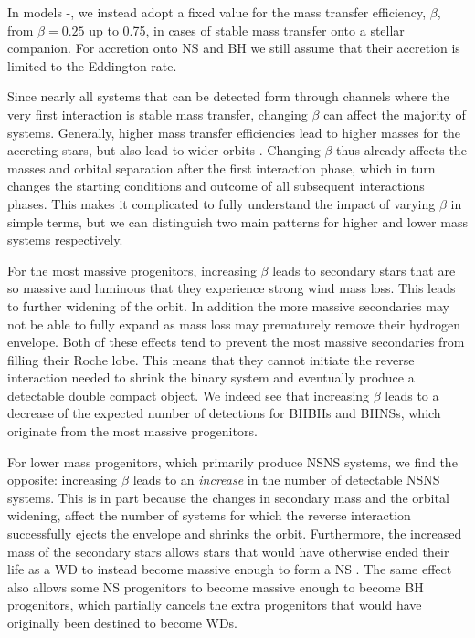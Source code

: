 In models \modBetaLow{}-\modBetaHigh{}, we instead adopt a fixed value for the mass transfer efficiency, $\beta$, from $\beta=0.25$ up to 0.75, in cases of stable mass transfer onto a stellar companion. For accretion onto NS and BH we still assume that their accretion is limited to the Eddington rate. 

Since nearly all systems that can be detected form through channels where the very first interaction is stable mass transfer, changing $\beta$ can affect the majority of systems. Generally, higher mass transfer efficiencies lead to higher masses for the accreting stars, but also lead to wider orbits \citep{Soberman+1997, vanSon+2020}. Changing $\beta$ thus already affects the masses and orbital separation after the first interaction phase, which in turn changes the starting conditions and outcome of all subsequent interactions phases. This makes it complicated to fully understand the impact of varying $\beta$ in simple terms, but we can distinguish two main patterns for higher and lower mass systems respectively.   

For the most massive progenitors, increasing $\beta$ leads to secondary stars that are so massive and luminous that they experience strong wind mass loss. This leads to further widening of the orbit. In addition the more massive secondaries may not be able to fully expand as mass loss may prematurely remove their hydrogen envelope. Both of these effects tend to prevent the most massive secondaries from filling their Roche lobe. This means that they cannot initiate the reverse interaction needed to shrink the binary system and eventually produce a detectable double compact object. We indeed see that increasing $\beta$ leads to a decrease of the expected number of detections for BHBHs and BHNSs, which originate from the most massive progenitors.  

For lower mass progenitors, which primarily produce NSNS systems, we find the opposite: increasing $\beta$ leads to an \textit{increase} in the number of detectable NSNS systems. This is in part because  the changes in secondary mass and the orbital widening, affect the number of systems for which the reverse interaction successfully ejects the envelope and shrinks the orbit. Furthermore, the increased mass of the secondary stars allows stars that would have otherwise ended their life as a WD to instead become massive enough to form a NS \citep[e.g.][]{Zapartas+2017}. The same effect also allows some NS progenitors to become massive enough to become BH progenitors, which partially cancels the extra progenitors that would have originally been destined to become WDs.


